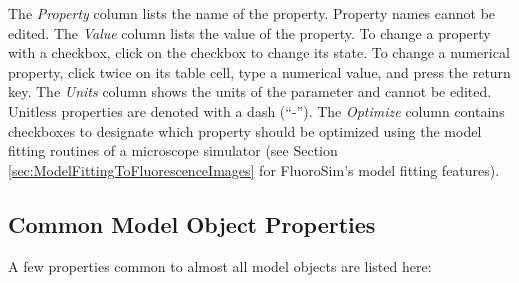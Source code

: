 \documentclass[11pt,titlepage,twoside]{article}
\begin{document}
The \emph{Property} column lists the name of the property. Property names cannot be edited. The \emph{Value} column lists the value of the property. To change a property with a checkbox, click on the checkbox to change its state. To change a numerical property, click twice on its table cell, type a numerical value, and press the return key. The \emph{Units} column shows the units of the parameter and cannot be edited. Unitless properties are denoted with a dash (``-''). The \emph{Optimize} column contains checkboxes to designate which property should be optimized using the model fitting routines of a microscope simulator (see Section \ref{sec:ModelFittingToFluorescenceImages} for FluoroSim's model fitting features).

\subsection{Common Model Object Properties}

A few properties common to almost all model objects are listed here:
\end{document}
